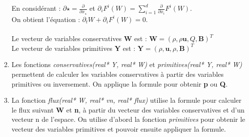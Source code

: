 \documentclass[a4paper,10pt]{article}
\begin{document}
\begin{enumerate}
    En consid\'erant :
    \begin{math}
      \partial\star = \frac{\partial}{\partial x_\star}
    \end{math}
     et
     \begin{math}
       \partial_iF^i(W) = \sum\limits_{i=1}^d\frac{\partial}{\partial x_i}F^i(W).
     \end{math} \\
     On obtient l'\'equation :
     \begin{math}
       \partial_tW+\partial_iF^i(W) = 0.
     \end{math}
     \\\\
     Le vecteur de variables conservatives \textbf{W} est :
     \begin{math}
       \textbf{W} =\left(\rho, \rho \textbf{u}, Q, \textbf{B}\right)^T
     \end{math}
     \\
     Le vecteur de variables primitives \textbf{Y} est :
     \begin{math}
       \textbf{Y} =\left(\rho, \textbf{u}, \rho, \textbf{B}\right)^T
     \end{math}

    \item
      Les fonctions \textit{conservatives(real* Y, real* W)} et \textit{primitives(real* Y, real* W)} permettent de calculer les variables conservatives \`a partir des variables primitives ou inversement. On applique la formule pour obtenir \textbf{p} ou \textbf{Q}.
    \item
      La fonction \textit{flux(real* W, real* vn, real* flux)} utilise la formule pour calculer le flux suivant \textbf{W} et \textbf{n}, \`a partir du vecteur des variables conservatives et d'un vecteur n de l'espace. On utilise d'abord la fonction \textit{primitives} pour obtenir le vecteur des variables primitives et pouvoir ensuite appliquer la formule.
   \end{enumerate}
\end{document}
